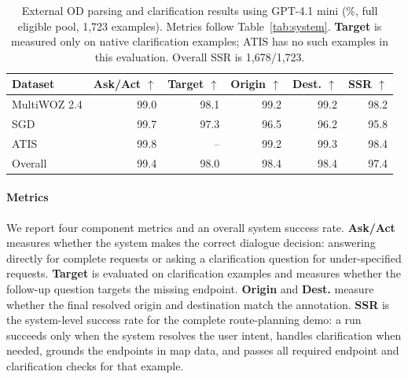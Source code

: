 \documentclass[11pt]{article}
\begin{document}
\begin{table}[ht]
\centering
\small
\setlength{\tabcolsep}{6pt}
\begin{tabular*}{\textwidth}{@{\extracolsep{\fill}}lrrrrr@{}}
\toprule
\textbf{Dataset} & \textbf{Ask/Act} $\uparrow$ & \textbf{Target} $\uparrow$ & \textbf{Origin} $\uparrow$ & \textbf{Dest.} $\uparrow$ & \textbf{SSR} $\uparrow$ \\
\midrule
MultiWOZ 2.4 & 99.0 & 98.1 & 99.2 & 99.2 & 98.2 \\
SGD & 99.7 & 97.3 & 96.5 & 96.2 & 95.8 \\
ATIS & 99.8 & -- & 99.2 & 99.3 & 98.4 \\
\midrule
Overall & 99.4 & 98.0 & 98.4 & 98.4 & 97.4 \\
\bottomrule
\end{tabular*}
\caption{External OD parsing and clarification results using GPT-4.1 mini (\%, full eligible pool, 1,723 examples). Metrics follow Table~\ref{tab:system}. \textbf{Target} is measured only on native clarification examples; ATIS has no such examples in this evaluation. Overall SSR is 1,678/1,723.}
\label{tab:external_od}
\end{table}

\paragraph{Metrics}
We report four component metrics and an overall system success rate. \textbf{Ask/Act} measures whether the system makes the correct dialogue decision: answering directly for complete requests or asking a clarification question for under-specified requests. \textbf{Target} is evaluated on clarification examples and measures whether the follow-up question targets the missing endpoint. \textbf{Origin} and \textbf{Dest.} measure whether the final resolved origin and destination match the annotation. \textbf{SSR} is the system-level success rate for the complete route-planning demo: a run succeeds only when the system resolves the user intent, handles clarification when needed, grounds the endpoints in map data, and passes all required endpoint and clarification checks for that example.
\end{document}
